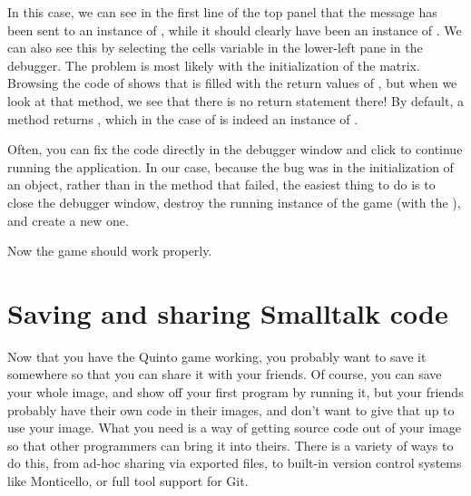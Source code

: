 \documentclass[a4paper,10pt,twoside]{book}
\begin{document}
In this case, we can see in the first line of the top panel that the  message has been sent to an instance of , while it should clearly have been an instance of .
We can also see this by selecting the cells variable in the lower-left pane in the debugger.
The problem is most likely with the initialization of the  matrix.
Browsing the code of  shows that  is filled with the return values of , but when we look at that method, we see that there is no return statement there!
By default, a method returns , which in the case of  is indeed an instance of .

\dothis{Close the debugger window.
	Add the expression ``\ct{^ cell}'' to the end of the method \ct{SBEGame>>>newCellAt:at:} so that it returns \ct{cell}.
	(See \mthref{newCellAt:at:nobug}.)}



Often, you can fix the code directly in the debugger window and click  to continue running the application.
In our case, because the bug was in the initialization of an object, rather than in the method that failed, the easiest thing to do is to close the debugger window, destroy the running instance of the game (with the ), and create a new one.

Now the game should work properly.

\section{Saving and sharing Smalltalk code}
\label{sec:Monticello}

Now that you have the Quinto game working, you probably want to save it somewhere so that you can share it with your friends.
Of course, you can save your whole \squeak image, and show off your first program by running it, but your friends probably have their own code in their images, and don't want to give that up to use your image.
What you need is a way of getting source code out of your \squeak image so that other programmers can bring it into theirs.
There is a variety of ways to do this, from ad-hoc sharing via exported files, to built-in version control systems like Monticello, or full tool support for Git.
\end{document}
